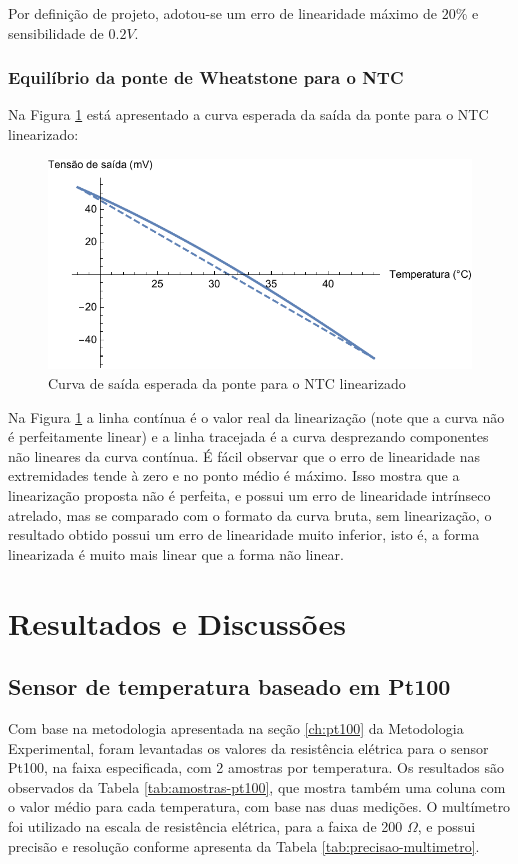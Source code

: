 \documentclass[a4paper]{instrumentacao}
\begin{document}

Por definição de projeto, adotou-se um erro de linearidade máximo de $20\%$ e sensibilidade de $0.2 V$. 

\subsection{Equilíbrio da ponte de Wheatstone para o NTC}


Na Figura \ref{fig:ntc-linear-esperado} está apresentado a curva esperada da saída da ponte para o NTC linearizado:

\begin{figure}[H]
\center
\includegraphics[width=\textwidth]{NTC-Linear-Esperado.pdf}
\caption{Curva de saída esperada da ponte para o NTC linearizado}
\label{fig:ntc-linear-esperado}
\end{figure}

Na Figura \ref{fig:ntc-linear-esperado} a linha contínua é o valor real da linearização (note que a curva não é perfeitamente linear) e a linha tracejada é a curva desprezando componentes não lineares da curva contínua. É fácil observar que o erro de linearidade nas extremidades tende à zero e no ponto médio é máximo. Isso mostra que a linearização proposta não é perfeita, e possui um erro de linearidade intrínseco atrelado, mas se comparado com o formato da curva bruta, sem linearização, o resultado obtido possui um erro de linearidade muito inferior, isto é, a forma linearizada é muito mais linear que a forma não linear.

\chapter{Resultados e Discussões}
\section{Sensor de temperatura baseado em Pt100}
Com base na metodologia apresentada na seção \ref{ch:pt100} da Metodologia Experimental, foram levantadas os valores da resistência elétrica para o sensor Pt100, na faixa especificada, com 2 amostras por temperatura. Os resultados são observados da Tabela \ref{tab:amostras-pt100}, que mostra também uma coluna com o valor médio para cada temperatura, com base nas duas medições. O multímetro foi utilizado na escala de resistência elétrica, para a faixa de 200 $\Omega$, e possui precisão e resolução conforme apresenta da Tabela \ref{tab:precisao-multimetro}.
\end{document}
